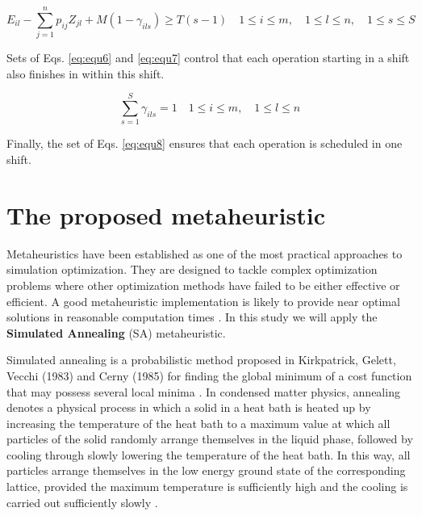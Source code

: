 \begin{equation}
E_{il} - \sum_{j=1}^{n} p_{ij}Z_{jl} + M(1 - \gamma_{ils}) \ge T(s - 1) \quad 1 \le i \le m, \quad 1 \le l \le n, \quad 1 \le s \le S
\label{eq:equ7}
\end{equation}

Sets of Eqs. \eqref{eq:equ6} and \eqref{eq:equ7} control that each operation starting in a shift also finishes in within this shift.

\begin{equation}
\sum_{s=1}^{S} \gamma_{ils} = 1 \quad 1 \le i \le m, \quad 1 \le l \le n
\label{eq:equ8}
\end{equation}

Finally, the set of Eqs. \eqref{eq:equ8} ensures that each operation is scheduled in one shift.

\section[The proposed metaheuristic]{The proposed metaheuristic}

Metaheuristics have been established as one of the most practical approaches to simulation optimization. They are designed to tackle complex optimization problems where other optimization methods have failed to be either effective or efficient. A good metaheuristic implementation is likely to provide near optimal solutions in reasonable computation times \cite{OLAFSSON2006633}. In this study we will apply the \textbf{Simulated Annealing} (SA) metaheuristic.

Simulated annealing is a probabilistic method proposed in Kirkpatrick, Gelett, Vecchi (1983) and Cerny (1985) for finding the global minimum of a cost function that may possess several local minima \cite{bertsimas1993simulated}. In condensed matter physics, annealing denotes a physical process in which a solid in a heat bath is heated up by increasing the temperature of the heat bath to a maximum value at which all particles of the solid randomly arrange themselves in the liquid phase, followed by cooling through slowly lowering the temperature of the heat bath. In this way, all particles arrange themselves in the low energy ground state of the corresponding lattice, provided the maximum temperature is sufficiently high and the cooling is carried out sufficiently slowly \cite{van1987simulated}.